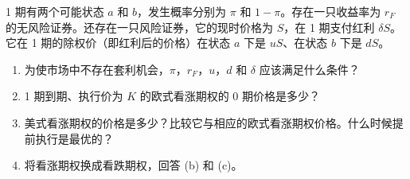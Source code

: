 \begin{problem}
\WJFiveProblem{} 1 期有两个可能状态 $a$ 和 $b$，发生概率分别为 $\pi$ 和 $1-\pi$。存在一只收益率为 $r_{F}$ 的无风险证券。还存在一只风险证券，它的现时价格为 $S$，在 1 期支付红利 $\delta S$。它在 1 期的除权价（即红利后的价格）在状态 $a$ 下是 $uS$、在状态 $b$ 下是 $dS$。
\begin{enumerate}[label=(\alph*)]
    \item 为使市场中不存在套利机会，$\pi$，$r_{F}$，$u$，$d$ 和 $\delta$ 应该满足什么条件？
    \item 1 期到期、执行价为 $K$ 的欧式看涨期权的 0 期价格是多少？
    \item 美式看涨期权的价格是多少？比较它与相应的欧式看涨期权价格。什么时候提前执行是最优的？
    \item 将看涨期权换成看跌期权，回答 (b) 和 (c)。
\end{enumerate}
\end{problem}
